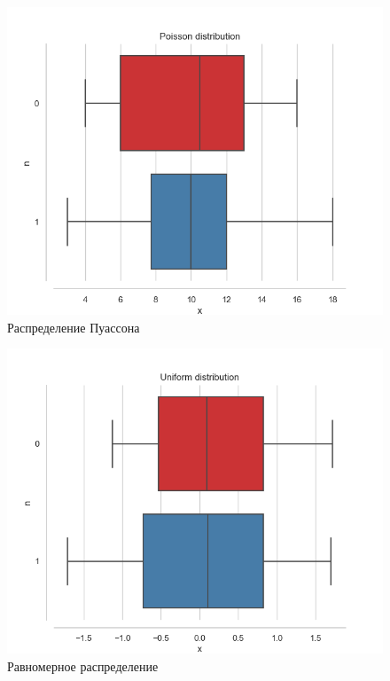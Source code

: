 \documentclass[../main.tex]{subfiles}
\begin{document}
    \begin{figure}[H]
        \centering
        \includegraphics[scale=0.8]{figures/PoissonBoxplot.png}
        \caption{Распределение Пуассона}
        \label{fig:normal}
    \end{figure}
    
    \begin{figure}[H]
        \centering
        \includegraphics[scale=0.8]{figures/UniformBoxplot.png}
        \caption{Равномерное распределение}
        \label{fig:normal}
    \end{figure}
    
\end{document}
